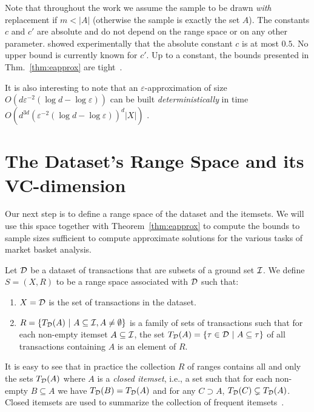 Note that throughout the work we assume the sample to be drawn \emph{with}
replacement if $m<|A|$ (otherwise the sample is exactly the set $A$).  The
constants $c$ and $c'$ are absolute and do not depend on the range space or on
any other parameter. \citet{LofflerP09} showed experimentally that the absolute
constant $c$ is at most $0.5$. No upper bound is currently known for $c'$.
Up to a constant, the bounds presented in Thm.~\ref{thm:eapprox} are
tight~\cite[Thm.~5]{LiLS01}. 

It is also interesting to note that an
$\varepsilon$-approximation of size
$O(d\varepsilon^{-2}(\log d-\log\varepsilon))$ can be built
\emph{deterministically} in time
$O(d^{3d}(\varepsilon^{-2}(\log d-\log\varepsilon))^d|X|)$
\citep{Chazelle00}.

\section{The Dataset's Range Space and its VC-dimension}\label{sec:vcdimar}
Our next step is to define a range space of the dataset and the itemsets. We
will use this space together with Theorem~\ref{thm:eapprox} to compute the bounds to
sample sizes sufficient to compute approximate solutions for the various tasks
of market basket analysis. 

\begin{definition}
  Let ${\cal D}$ be a dataset of transactions that are subsets of a ground set
  ${\cal I}$.  We define $S=(X,R)$ to be a range space associated with ${\cal D}$ such
  that:
  \begin{enumerate}
    \item $X={\cal D}$ is the set of transactions in the dataset.
    \item $R=\{T_{\cal D}(A) ~|~ A\subseteq {\cal I}, A\neq\emptyset\}$ is a family of
      sets of transactions such that for each non-empty itemset
      $A\subseteq{\cal I}$, the set $T_{\cal D}(A)=\{\tau\in{\cal D} ~|~ A\subseteq\tau\}$ of
      all transactions containing $A$ is an element of $R$.
  \end{enumerate}
\end{definition}

It is easy to see that in practice the collection $R$ of ranges contains all and only
the sets $T_{\cal D}(A)$ where $A$ is a \emph{closed itemset}, i.e., a set such that
for each non-empty $B\subseteq A$ we have $T_{\cal D}(B)=T_{\cal D}(A)$ and for any
$C\supset A$, $T_{\cal D}(C)\subsetneq T_{\cal D}(A)$. Closed itemsets are used to
summarize the collection of frequent itemsets~\citep{CaldersRB06}.

